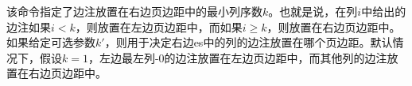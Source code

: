 该命令指定了边注放置在右边页边距中的最小列序数$k$。也就是说，在列$i$中给出的边注如果$i<k$，则放置在左边页边距中，而如果$i\geq k$，则放置在右边页边距中。如果给定可选参数$k'$，则用于决定右边\parapag{}es中的列的边注放置在哪个页边距。默认情况下，假设$k=1$，左边最左列-0的边注放置在左边页边距中，而其他列的边注放置在右边页边距中。
% 

% 
